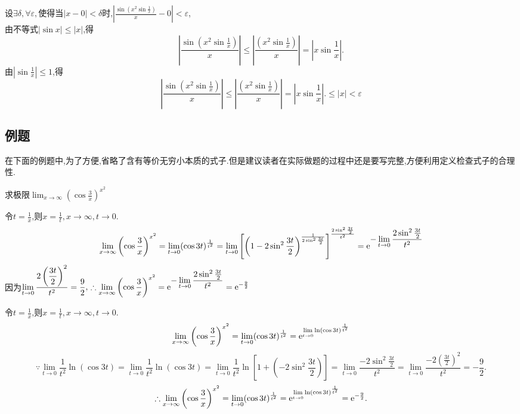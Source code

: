 \solve 设$\exists \delta, \forall \varepsilon,$使得当$|x-0|<\delta$时,$\displaystyle \left| \frac{\sin \left( x^2\sin\frac{1}{x}\right) }{x}-0\right|<\varepsilon$,\\[0.5em]
由不等式$|\sin x|\le |x|$,得
\[
\left| \frac{\sin \left( x^2\sin\frac{1}{x}\right) }{x}\right| \le \left| \frac{ \left( x^2\sin\frac{1}{x}\right) }{x}\right| =\left| x \sin \frac{1}{x} \right|.
\]
由$\displaystyle \left| \sin \frac{1}{x} \right| \le 1$,得
\[
\left| \frac{\sin \left( x^2\sin\frac{1}{x}\right) }{x}\right| \le \left| \frac{ \left( x^2\sin\frac{1}{x}\right) }{x}\right| =\left| x \sin \frac{1}{x} \right|.\le |x|<\varepsilon
\]

\subsection{例题}
\sj
\example[等价无穷小的运用]
在下面的例题中,为了方便,省略了含有等价无穷小本质的式子.但是建议读者在实际做题的过程中还是要写完整,方便利用定义检查式子的合理性.

\examples 求极限$\displaystyle \lim_{x \to \infty}\left(\cos \frac{3}{x} \right)^{x^2} $

\solve 令$\displaystyle t=\frac{1}{x}$,则$x=\frac{1}{t},x\to \infty ,t \to 0.$
\[
\lim_{x \to \infty}\left(\cos \frac{3}{x} \right)^{x^2} =\lim_{t \to 0}(\cos 3t)^{\frac{1}{t^2}}=\lim_{t \to 0}\left[\left( 1-2\sin^2\frac{3t}{2}\right)^{\frac{1}{2\sin^2\frac{3t}{2}}} \right]^{\frac{2\sin^2\frac{3t}{2}}{t^2}} ={\rm{e}}^{\displaystyle -\lim_{t \to 0}\frac{2\sin^2\frac{3t}{2}}{t^2}}
\]
因为$\displaystyle \lim_{t \to 0}\frac{2\left( \displaystyle \frac{3t}{2}\right)^2 }{t^2}=\frac{9}{2},\,\therefore \lim_{x \to \infty }\left(\cos \frac{3}{x} \right)^{x^2}={\rm{e}}^{ \displaystyle  -\lim_{t \to 0}\frac{2\sin^2\frac{3t}{2}}{t^2}}={\rm{e}} ^{-\frac{9}{2}} $

\solveother 令$\displaystyle t=\frac{1}{x}$,则$\displaystyle x=\frac{1}{t},x\to \infty ,t \to 0.$
\[
\lim_{x \to \infty}\left( \cos \frac{3}{x}\right)^{x^2} =\lim_{t \to 0}(\cos 3t)^{\frac{1}{t^2}}={\rm{e}}^{\lim\limits_{t \to 0}\ln(\cos 3t)^{\frac{1}{t^2}}}
\]
\[
\because \lim\limits_{t \to 0}\frac{1}{t^2}\ln(\cos 3t)=\lim\limits_{t \to 0}\frac{1}{t^2}\ln (\cos 3t)=\lim\limits_{t \to 0}\frac{1}{t^2}\ln \left[1+\left(-2\sin^2\frac{3t}{2}\right)\right]=\lim_{t \to 0}\frac{-2\sin^2\frac{3t}{2}}{t^2}=\lim\limits_{t \to 0}\frac{-2\left(\frac{3t}{2}\right)^2}{t^2}=-\frac{9}{2}.
\]
\[
\therefore \lim_{x \to \infty}\left( \cos \frac{3}{x}\right)^{x^2}=\lim\limits_{t \to 0}(\cos 3t)^{\frac{1}{t^2}}={\rm{e}}^{\lim\limits_{t \to 0}\ln(\cos 3t)^{\frac{1}{t^2}}}={\rm{e}}^{-\frac{9}{2}}.
\]

